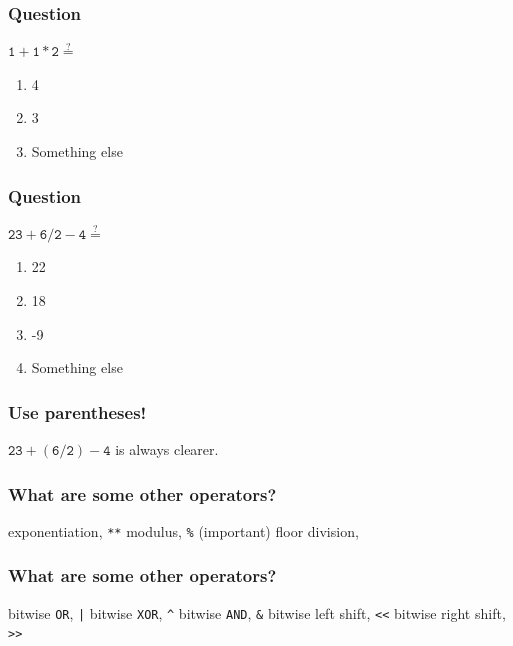 \documentclass[11pt]{beamer}
\begin{document}
\begin{frame}
  \frametitle{Question}
  \Enlarge

  $\mathtt{1 + 1 * 2} \overset{?}{=}$
  \begin{enumerate}[label=\Alph*]
  \item  4
  \item  3
  \item  Something else
  \end{enumerate}
\end{frame}

\begin{frame}
  \frametitle{Question}
  \Enlarge

  $\mathtt{23 + 6 / 2 - 4} \overset{?}{=}$
  \begin{enumerate}[label=\Alph*]
  \item  22
  \item  18
  \item  -9
  \item  Something else
  \end{enumerate}
\end{frame}

\begin{frame}
  \frametitle{Use parentheses!}
  \Enlarge

  $\mathtt{23 + \left(6 / 2\right) - 4}$ is always clearer.
\end{frame}

\begin{frame}
  \frametitle{What are some other operators?}
  \Enlarge

  \begin{itemize}
  \myitem  exponentiation, \texttt{**}
  \myitem  modulus, \texttt{\%}  (important)
  \myitem  floor division, \texttt{\\}
  \end{itemize}
\end{frame}

\begin{frame}
  \frametitle{What are some other operators?}
  \Enlarge

  \begin{itemize}
  \myitem  bitwise \texttt{OR}, \texttt{|}
  \myitem  bitwise \texttt{XOR}, \texttt{\^{}}
  \myitem  bitwise \texttt{AND}, \texttt{\&}
  \myitem  bitwise left shift, \texttt{<{}<}
  \myitem  bitwise right shift, \texttt{>{}>}
  \end{itemize}
\end{frame}
\end{document}

